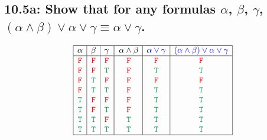 \documentclass{article}
\begin{document}
\subsection*{10.5a: Show that for any formulas $\alpha$, $\beta$, $\gamma$, $(\alpha\land\beta)\lor\alpha\lor\gamma\equiv\alpha\lor\gamma$.}
\[\begin{array}{|c|c|c||c|c|c|}
\hline
\alpha&\beta&\gamma&\alpha\land\beta&\textcolor{blue}{\alpha\lor\gamma}&\textcolor{blue}{(\alpha\land\beta)\lor\alpha\lor\gamma}\\
\hline
\textcolor{red}{\tt{F}}&\textcolor{red}{\tt{F}}&\textcolor{red}{\tt{F}}&\textcolor{red}{\tt{F}}&\textcolor{red}{\tt{F}}&\textcolor{red}{\tt{F}}\\
\textcolor{red}{\tt{F}}&\textcolor{red}{\tt{F}}&\textcolor{ForestGreen}{\tt{T}}&\textcolor{red}{\tt{F}}&\textcolor{ForestGreen}{\tt{T}}&\textcolor{ForestGreen}{\tt{T}}\\
\textcolor{red}{\tt{F}}&\textcolor{ForestGreen}{\tt{T}}&\textcolor{red}{\tt{F}}&\textcolor{red}{\tt{F}}&\textcolor{red}{\tt{F}}&\textcolor{red}{\tt{F}}\\
\textcolor{red}{\tt{F}}&\textcolor{ForestGreen}{\tt{T}}&\textcolor{ForestGreen}{\tt{T}}&\textcolor{red}{\tt{F}}&\textcolor{ForestGreen}{\tt{T}}&\textcolor{ForestGreen}{\tt{T}}\\
\textcolor{ForestGreen}{\tt{T}}&\textcolor{red}{\tt{F}}&\textcolor{red}{\tt{F}}&\textcolor{red}{\tt{F}}&\textcolor{ForestGreen}{\tt{T}}&\textcolor{ForestGreen}{\tt{T}}\\
\textcolor{ForestGreen}{\tt{T}}&\textcolor{red}{\tt{F}}&\textcolor{ForestGreen}{\tt{T}}&\textcolor{red}{\tt{F}}&\textcolor{ForestGreen}{\tt{T}}&\textcolor{ForestGreen}{\tt{T}}\\
\textcolor{ForestGreen}{\tt{T}}&\textcolor{ForestGreen}{\tt{T}}&\textcolor{red}{\tt{F}}&\textcolor{ForestGreen}{\tt{T}}&\textcolor{ForestGreen}{\tt{T}}&\textcolor{ForestGreen}{\tt{T}}\\
\textcolor{ForestGreen}{\tt{T}}&\textcolor{ForestGreen}{\tt{T}}&\textcolor{ForestGreen}{\tt{T}}&\textcolor{ForestGreen}{\tt{T}}&\textcolor{ForestGreen}{\tt{T}}&\textcolor{ForestGreen}{\tt{T}}\\
\hline
\end{array}\]
\end{document}
